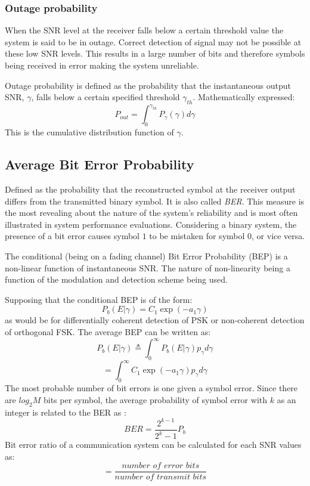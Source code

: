 \subsubsection{Outage probability}
When the \gls{SNR} level at the receiver falls below a certain threshold value the system is said to be in outage. Correct detection of signal may not be possible at these low \gls{SNR} levels. This results in a large number of bits and therefore \gls{symbol}s being received in error making the system unreliable\cite{MIMO}.

Outage probability is defined as the probability that the instantaneous output \gls{SNR}, $\gamma$, falls below a certain specified threshold $\gamma_{th}$\cite{dcommoha}. Mathematically expressed:
$$P_{out} = \int_0^{\gamma_{th}} P_{\gamma}\left(\gamma\right) d\gamma$$
This is the cumulative distribution function of $\gamma$.

\subsection{Average Bit Error Probability}
Defined as the probability that the reconstructed \gls{symbol} at the receiver output differs from the transmitted binary \gls{symbol}. It is also called \textit{\gls{BER}}. This measure is the most revealing about the nature of the system's reliability and is most often illustrated in system performance evaluations. Considering a binary system, the presence of a bit error causes \gls{symbol} $1$ to be mistaken for \gls{symbol} $0$, or
vice versa.\cite{hayk} 

The conditional (being on a fading channel) Bit Error Probability (BEP) is a non-linear function of instantaneous \gls{SNR}. The nature of non-linearity being a function of the modulation and detection scheme being used.\cite{dcommoha}

Supposing that the conditional BEP is of the form:
$$P_b\left( E|\gamma\right) = C_1 \exp \left( -a_1\gamma\right)$$
as would be for differentially coherent detection of \gls{PSK} or non-coherent detection of orthogonal \gls{FSK}. The average BEP can be written as:
$$P_b\left( E|\gamma\right) \triangleq \int_0^{\infty} P_b\left( E|\gamma\right) p_{\gamma}d\gamma$$
$$=\int_0^{\infty} C_1 \exp \left( -a_1\gamma\right) p_{\gamma}d\gamma$$
The most probable number of bit errors is one given a \gls{symbol} error. Since there are $log_2 M$ bits per
\gls{symbol}, the average probability of \gls{symbol} error with $k$ as an integer is related to the BER as :
$$BER=\frac{2^{k-1}}{2^{k}-1}P_b$$
Bit error ratio of a communication system can be calculated for each \gls{SNR} values as:
$$ =\frac{\textit{number  of  error  bits}}{\textit{number  of  transmit  bits}}$$

